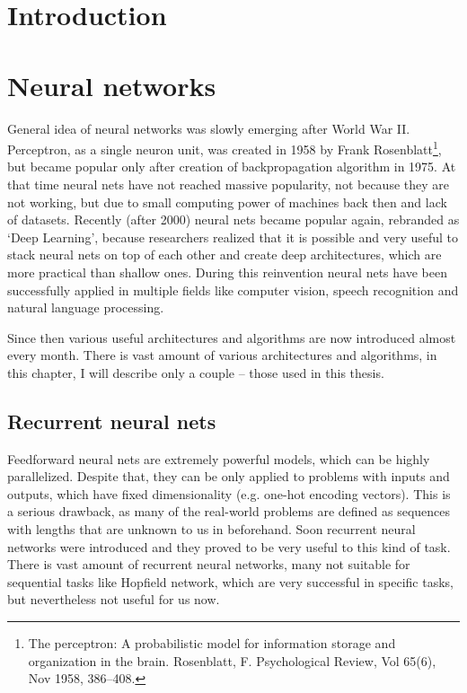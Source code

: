 
\chapter{Introduction}

\chapter{Neural networks} 
General idea of neural networks was slowly emerging after World War II. Perceptron, as a single neuron unit, was created in 1958 by Frank Rosenblatt\footnote{The perceptron: A probabilistic model for information storage and organization in the brain. Rosenblatt, F. Psychological Review, Vol 65(6), Nov 1958, 386--408.}, but became popular only after creation of backpropagation algorithm in 1975. At that time neural nets have not reached massive popularity, not because they are not working, but due to small computing power of machines back then and lack of datasets. Recently (after 2000) neural nets became popular again, rebranded as \textquoteleft Deep Learning\textquoteright, because researchers realized that it is possible and very useful to stack neural nets on top of each other and create deep architectures, which are more practical than shallow ones. During this reinvention neural nets have been successfully applied in multiple fields like computer vision, speech recognition and natural language processing.

Since then various useful architectures and algorithms are now introduced almost every month. There is vast amount of various architectures and algorithms, in this chapter, I will describe only a couple -- those used in this thesis.

	\section{Recurrent neural nets}
Feedforward neural nets are extremely powerful models, which can be highly parallelized. Despite that, they can be only applied to problems with inputs and outputs, which have fixed dimensionality (e.g. one-hot encoding vectors). This is a serious drawback, as many of the real-world problems are defined as sequences with lengths that are unknown to us in beforehand. Soon recurrent neural networks were introduced and they proved to be very useful to this kind of task. There is vast amount of recurrent neural networks, many not suitable for sequential tasks like Hopfield network, which are very successful in specific tasks, but nevertheless not useful for us now.

